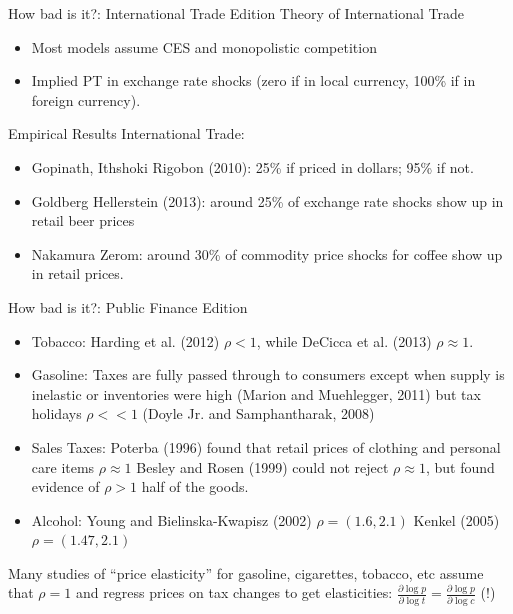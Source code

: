\begin{frame}{How bad is it?: International Trade Edition}
Theory of International Trade
\begin{itemize}
\item Most models assume CES and monopolistic competition
\item Implied PT in exchange rate shocks (zero if in local currency, 100\% if in foreign currency).
\end{itemize}

Empirical Results International Trade:
\begin{itemize}
\item Gopinath, Ithshoki Rigobon (2010): 25\% if priced in dollars; 95\% if not.
\item Goldberg Hellerstein (2013): around 25\% of exchange rate shocks show up in retail beer prices
\item Nakamura Zerom: around 30\% of commodity price shocks for coffee show up in retail prices.
\end{itemize}
\end{frame}

\begin{frame}{How bad is it?: Public Finance Edition}
\begin{itemize}
\item Tobacco: Harding et al. (2012) $\rho < 1$, while DeCicca et al. (2013) $\rho \approx 1$.
\item Gasoline: Taxes are fully passed through to consumers except when supply is inelastic or inventories were high (Marion and Muehlegger, 2011) but tax holidays $\rho << 1$ (Doyle Jr. and Samphantharak, 2008)
\item Sales Taxes: Poterba (1996) found that retail prices of clothing and personal care items $\rho \approx 1$ Besley and Rosen (1999) could not reject $\rho \approx 1$, but found evidence of $\rho >1$ half of the goods.
\item Alcohol:  Young and Bielinska-Kwapisz (2002) $\rho = (1.6,2.1)$ Kenkel (2005) $\rho=(1.47,2.1)$
\end{itemize}
Many studies of ``price elasticity'' for gasoline, cigarettes, tobacco, etc assume that $\rho=1$ and regress prices on tax changes to get elasticities: $\frac{\partial \log p}{\partial \log t} = \frac{\partial \log p}{\partial \log c}$ (!)
\end{frame}





